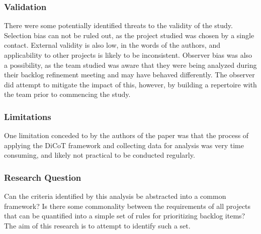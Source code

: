 \subsubsection{Validation}
There were some potentially identified threats to the validity of the study. Selection bias can not be ruled out, as the project studied was chosen by a single contact. External validity is also low, in the words of the authors, and applicability to other projects is likely to be inconsistent. Observer bias was also a possibility, as the team studied was aware that they were being analyzed during their backlog refinement meeting and may have behaved differently. The observer did attempt to mitigate the impact of this, however, by building a repertoire with the team prior to commencing the study.

\subsubsection{Limitations}
One limitation conceded to by the authors of the paper was that the process of applying the DiCoT framework and collecting data for analysis was very time consuming, and likely not practical to be conducted regularly.

\subsubsection{Research Question}
Can the criteria identified by this analysis be abstracted into a common framework? Is there some commonality between the requirements of all projects that can be quantified into a simple set of rules for prioritizing backlog items? The aim of this research is to attempt to identify such a set.
